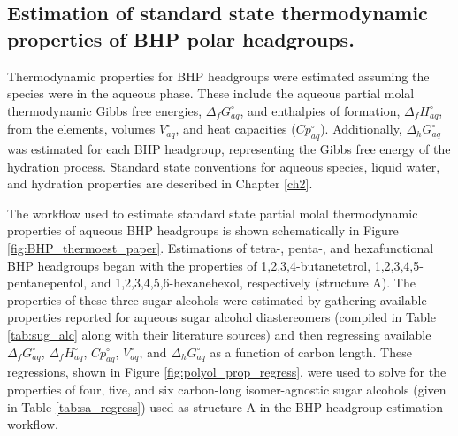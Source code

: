 \subsection{Estimation of standard state thermodynamic properties of BHP polar headgroups.}
Thermodynamic properties for BHP headgroups were estimated assuming the species were in the aqueous phase. These include the aqueous partial molal thermodynamic Gibbs free energies, $\Delta_{f}G_{aq}^{\circ}$, and enthalpies of formation, $\Delta_{f}H_{aq}^{\circ}$, from the elements, volumes $V_{aq}^{\circ}$, and heat capacities ($Cp_{aq}^{\circ}$). Additionally, $\Delta_{h}G^{\circ}_{aq}$ was estimated for each BHP headgroup, representing the Gibbs free energy of the hydration process. Standard state conventions for aqueous species, liquid water, and hydration properties are described in Chapter \ref{ch2}.

The workflow used to estimate standard state partial molal thermodynamic properties of aqueous BHP headgroups is shown schematically in Figure \ref{fig:BHP_thermoest_paper}. Estimations of tetra-, penta-, and hexafunctional BHP headgroups began with the properties of 1,2,3,4-butanetetrol, 1,2,3,4,5-pentanepentol, and 1,2,3,4,5,6-hexanehexol, respectively (structure A). The properties of these three sugar alcohols were estimated by gathering available properties reported for aqueous sugar alcohol diastereomers (compiled in Table \ref{tab:sug_alc} along with their literature sources) and then regressing available $\Delta_{f}G^{\circ}_{aq}$, $\Delta_{f}H^{\circ}_{aq}$, $Cp^{\circ}_{aq}$, $V^{\circ}_{aq}$, and $\Delta_{h}G^{\circ}_{aq}$ as a function of carbon length. These regressions, shown in Figure \ref{fig:polyol_prop_regress}, were used to solve for the properties of four, five, and six carbon-long isomer-agnostic sugar alcohols (given in Table \ref{tab:sa_regress}) used as structure A in the BHP headgroup estimation workflow.


